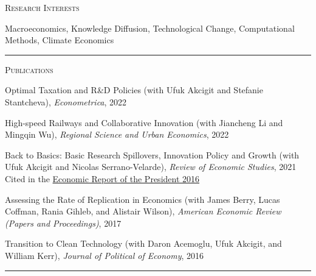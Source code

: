 \documentclass{article}
\begin{document}
\parbox{\textwidth}{
\parbox[t]{0.28\textwidth}{ \raggedright \noindent \textsc{ Research Interests } }
\parbox[t]{0.72\textwidth}{ \raggedright

Macroeconomics, Knowledge Diffusion, Technological Change, Computational Methods, Climate Economics
\vspace{0.27cm}

}
\textcolor{light-gray}{\hrule}
}
\vspace{0.3cm}

\parbox{\textwidth}{
\parbox[t]{0.28\textwidth}{ \raggedright \noindent \textsc{ Publications } }
\parbox[t]{0.72\textwidth}{ \raggedright

Optimal Taxation and R\&D Policies (with Ufuk Akcigit and Stefanie Stantcheva), \textit{Econometrica}, 2022
\vspace{0.27cm}

High-speed Railways and Collaborative Innovation (with Jiancheng Li and Mingqin Wu), \textit{Regional Science and Urban Economics}, 2022
\vspace{0.27cm}

Back to Basics: Basic Research Spillovers, Innovation Policy and Growth (with Ufuk Akcigit and Nicolas Serrano-Velarde), \textit{Review of Economic Studies}, 2021  \\
 Cited in the \href{https://www.gpo.gov/fdsys/pkg/ERP-2016/pdf/ERP-2016.pdf}{Economic Report of the President 2016}
\vspace{0.27cm}

Assessing the Rate of Replication in Economics (with James Berry, Lucas Coffman, Rania Gihleb, and Alistair Wilson), \textit{American Economic Review (Papers and Proceedings)}, 2017
\vspace{0.27cm}

Transition to Clean Technology (with Daron Acemoglu, Ufuk Akcigit, and William Kerr), \textit{Journal of Political of Economy}, 2016
\vspace{0.27cm}

}
\textcolor{light-gray}{\hrule}
}
\vspace{0.3cm}
\end{document}
